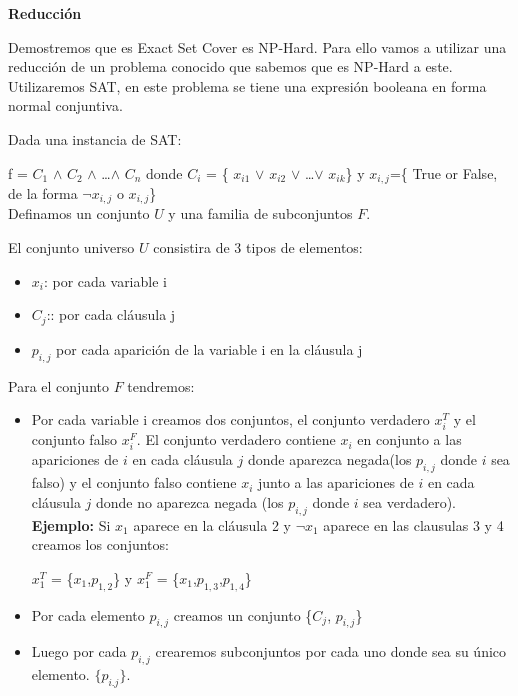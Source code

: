 \documentclass{article}
\begin{document}
\textbf{Reducción}

Demostremos que es Exact Set Cover es NP-Hard. Para ello vamos a utilizar una reducción de un problema conocido que sabemos que es NP-Hard a este.
Utilizaremos SAT, en este problema se tiene  una expresión booleana en forma normal conjuntiva.

Dada una instancia de SAT:

f = $C_1$ $\wedge$ $C_2$ $\wedge$ \dots $\wedge$ $C_n$
donde $C_i$ = \{ $x_{i1}$ $\vee$ $x_{i2}$ $\vee$ \dots $\vee$ $x_{ik}$\}
y \(x_{i,j}\)=\{ True or False, de la forma $\neg$$x_{i,j}$ o $x_{i,j}$\}\\

Definamos un conjunto \(U\) y una familia de subconjuntos \(F\).

El conjunto universo \(U\) consistira de 3 tipos de elementos:

\begin{itemize}
    \item $x_i$: por cada variable i
    \item $C_j$:: por cada cláusula j
    \item $p_{i,j}$ por cada aparición de la variable i en la cláusula j \\
\end{itemize} 



Para el conjunto \(F\) tendremos:
\begin{itemize}
    \item Por cada variable i creamos dos conjuntos, el conjunto verdadero $x_{i}^{T}$ y el conjunto falso $x_{i}^{F}$. El conjunto verdadero contiene $x_i$ en conjunto a las apariciones de \(i\) en cada cláusula \(j\) donde aparezca negada(los $p_{i,j}$ donde $i$ sea falso) y el conjunto falso contiene $x_i$ junto a las apariciones de \(i\) en cada cláusula \(j\) donde no aparezca negada (los $p_{i,j}$ donde $i$ sea verdadero).\\

    \textbf{Ejemplo:} Si $x_1$ aparece en la cláusula 2 y $\neg$$x_1$ aparece en las clausulas 3 y 4 creamos los conjuntos:

    $x_{1}^{T}$ = \{$x_1$,$p_{1,2}$\} y $x_{1}^{F}$ = \{$x_1$,$p_{1,3}$,$p_{1,4}$\}\\
    \item Por cada elemento $p_{i,j}$ creamos un conjunto \{$C_j$, $p_{i,j}$\}
    \item Luego por cada $p_{i,j}$ crearemos subconjuntos por cada uno donde sea su único elemento. $\{p_{i.j}\}$.
\end{itemize}
\end{document}
